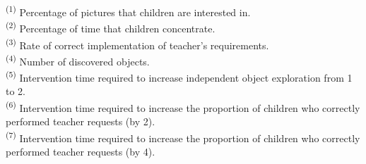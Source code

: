 
\begin{tableorg}
    \caption{Comparison of expert survey results and eye tracking solution application results – subject 2}
    \label{tb10}
    \renewcommand{\arraystretch}{2.3}
    \centering
    
    \vspace{2mm}
    \parbox{\linewidth}{
    \footnotesize
    \textsuperscript{(1)} Percentage of pictures that children are interested in. \\
    \textsuperscript{(2)} Percentage of time that children concentrate.\\
    \textsuperscript{(3)} Rate of correct implementation of teacher's requirements. \\
    \textsuperscript{(4)} Number of discovered objects. \\
    \textsuperscript{(5)} Intervention time required to increase independent object exploration from 1 to 2. \\
    \textsuperscript{(6)} Intervention time required to increase the proportion of children who correctly performed teacher requests (by 2). \\
    \textsuperscript{(7)} Intervention time required to increase the proportion of children who correctly performed teacher requests (by 4).}
\end{tableorg}

